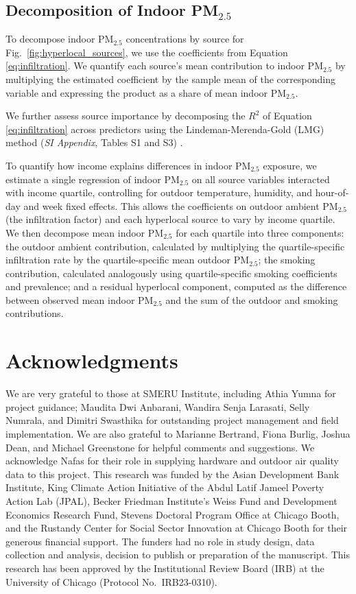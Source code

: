 \documentclass[reqno,12pt,notitlepage]{article}
\providecommand{\DIFadd}[1]{{\protect\color{BLUE}#1}} %
\providecommand{\DIFaddbegin}{} %
\providecommand{\DIFaddend}{} %
\begin{document}
\DIFaddbegin \subsection{\DIFadd{Decomposition of Indoor PM$_{2.5}$}}

\DIFadd{To decompose indoor PM$_{2.5}$ concentrations by source for Fig.\ \ref{fig:hyperlocal_sources}, we use the coefficients from Equation \ref{eq:infiltration}. We quantify each source's mean contribution to indoor PM$_{2.5}$ by multiplying the estimated coefficient by the sample mean of the corresponding variable and expressing the product as a share of mean indoor PM$_{2.5}$. 
}

\DIFadd{We further assess source importance by decomposing the $R^2$ of Equation \ref{eq:infiltration} across predictors using the Lindeman-Merenda-Gold (LMG) method (\textit{SI Appendix}, Tables S1 and S3) \citep{lindeman_introduction_1980, gromping_relative_2006}.
}


\DIFadd{To quantify how income explains differences in indoor PM$_{2.5}$ exposure, we estimate a single regression of indoor PM$_{2.5}$ on all source variables interacted with income quartile, controlling for outdoor temperature, humidity, and hour-of-day and week fixed effects. This allows the coefficients on outdoor ambient PM$_{2.5}$ (the infiltration factor) and each hyperlocal source to vary by income quartile. We then decompose mean indoor PM$_{2.5}$ for each quartile into three components: the outdoor ambient contribution, calculated by multiplying the quartile-specific infiltration rate by the quartile-specific mean outdoor PM$_{2.5}$; the smoking contribution, calculated analogously using quartile-specific smoking coefficients and prevalence; and a residual hyperlocal component, computed as the difference between observed mean indoor PM$_{2.5}$ and the sum of the outdoor and smoking contributions.
}

\DIFaddend 

\section*{Acknowledgments}
We are very grateful to those at SMERU Institute, including Athia Yumna for project guidance; Maudita Dwi Anbarani, Wandira Senja Larasati, Selly Numrala, and Dimitri Swasthika for outstanding project management and field implementation. We are also grateful to Marianne Bertrand, Fiona Burlig, Joshua Dean, and Michael Greenstone for helpful comments and suggestions. We acknowledge Nafas for their role in supplying hardware and outdoor air quality data to this project. This research was funded by the Asian Development Bank Institute, King Climate Action Initiative of the Abdul Latif Jameel Poverty Action Lab (JPAL), Becker Friedman Institute's Weiss Fund and Development Economics Research Fund, Stevens Doctoral Program Office at Chicago Booth, and the Rustandy Center for Social Sector Innovation at Chicago Booth for their generous financial support. The funders had no role in study design, data collection and analysis, decision to publish or preparation of the manuscript. This research has been approved by the Institutional Review Board (IRB) at the University of Chicago (Protocol No.\ IRB23-0310).



\end{document}
